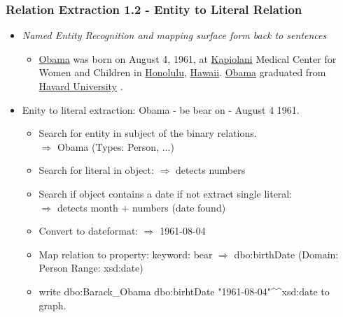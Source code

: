 \documentclass{beamer}
\begin{document}
\begin{frame}
\frametitle{Relation Extraction 1.2 - Entity to Literal Relation}
\begin{example}
	\begin{itemize}
	\item \textit{Named Entity Recognition and mapping surface form back to sentences} \\
	\begin{itemize} \item \underline{Obama} was born on August 4, 1961, at \underline{Kapiolani} Medical Center for Women and Children in \underline{Honolulu}, \underline{Hawaii}. \underline{Obama} graduated from \underline{Havard University} .
	\end{itemize}
	\item Enity to literal extraction: Obama - be bear on - August 4 1961. \begin{itemize} \item Search for entity in subject of the binary relations. \\ $\Rightarrow$ Obama (Types: Person, ...) 
	\item Search for literal in object: $\Rightarrow$ detects numbers 
	\item Search if object contains a date if not extract single literal: \\ $\Rightarrow$ detects month + numbers (date found)
	\item Convert to dateformat: $\Rightarrow$  1961-08-04
	\item Map relation to property: keyword: bear  $\Rightarrow$ dbo:birthDate (Domain: Person Range: xsd:date)
	\item write dbo:Barack\_Obama dbo:birhtDate "1961-08-04"\textasciicircum{}\textasciicircum{}xsd:date to graph.
	\end{itemize}		 
\end{itemize}
\end{example}
\end{frame}
\end{document}
